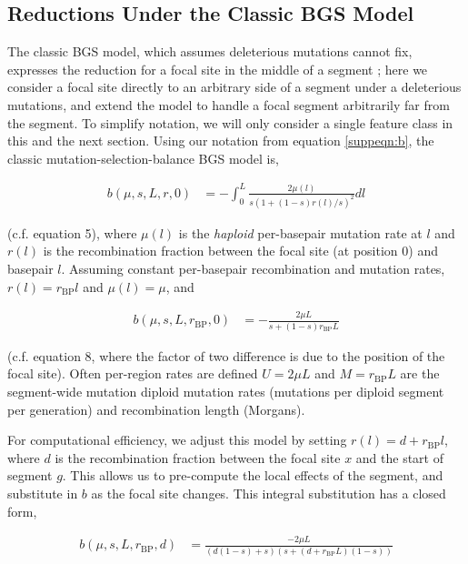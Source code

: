 \documentclass[11pt]{article}
\begin{document}
\subsection{Reductions Under the Classic BGS Model}

The classic BGS model, which assumes deleterious mutations cannot fix,
expresses the reduction for a focal site in the middle of a segment
\parencite{Hudson1995-xc,Hudson1994-oh,Nordborg1996-nq}; here we consider a
focal site directly to an arbitrary side of a segment under a deleterious
mutations, and extend the model to handle a focal segment arbitrarily far from
the segment. To simplify notation, we will only consider a single feature class
in this and the next section. Using our notation from equation
\eqref{suppeqn:b}, the classic mutation-selection-balance BGS model is,

\begin{align}
  b(\mu, s, L, r, 0) &=  - \int_0^L \frac{2\mu(l)}{s (1 + (1-s) r(l)/s)^2} dl 
\end{align}
 
(c.f. \cite{Hudson1995-xc} equation 5), where $\mu(l)$ is the \emph{haploid}
per-basepair mutation rate at $l$ and $r(l)$ is the recombination fraction
between the focal site (at position 0) and basepair $l$. Assuming constant
per-basepair recombination and mutation rates, $r(l) = r_\text{BP}l$ and
$\mu(l) = \mu$, and

\begin{align}
  b(\mu, s, L, r_\text{BP}, 0) &= - \frac{2\mu L}{s + (1-s) r_\text{BP} L} 
\end{align}

(c.f. \cite{Hudson1995-xc} equation 8, where the factor of two difference is
due to the position of the focal site). Often per-region rates are defined $U =
2 \mu L$ and $M = r_\text{BP} L$ are the segment-wide mutation diploid mutation
rates (mutations per diploid segment per generation) and recombination length
(Morgans). 

For computational efficiency, we adjust this model by setting $r(l) = d +
r_\text{BP} l$, where $d$ is the recombination fraction between the focal site
$x$ and the start of segment $g$. This allows us to pre-compute the local
effects of the segment, and substitute in $b$ as the focal site changes. This
integral substitution has a closed form,

\begin{align}
  b(\mu, s, L, r_\text{BP}, d) &= \frac{-2\mu L}{(d(1-s) + s)(s + (d + r_\text{BP}L)(1-s))}
\end{align}
\end{document}

